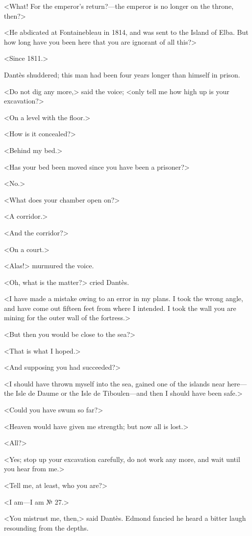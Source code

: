  <What! For the emperor's return?—the emperor is no longer on the throne, then?> 

 <He abdicated at Fontainebleau in 1814, and was sent to the Island of Elba. But how long have you been here that you are ignorant of all this?> 

 <Since 1811.> 

 Dantès shuddered; this man had been four years longer than himself in prison. 

 <Do not dig any more,> said the voice; <only tell me how high up is your excavation?> 

 <On a level with the floor.> 

 <How is it concealed?> 

 <Behind my bed.> 

 <Has your bed been moved since you have been a prisoner?> 

 <No.> 

 <What does your chamber open on?> 

 <A corridor.> 

 <And the corridor?> 

 <On a court.> 

 <Alas!> murmured the voice. 

 <Oh, what is the matter?> cried Dantès. 

 <I have made a mistake owing to an error in my plans. I took the wrong angle, and have come out fifteen feet from where I intended. I took the wall you are mining for the outer wall of the fortress.> 

 <But then you would be close to the sea?> 

 <That is what I hoped.> 

 <And supposing you had succeeded?> 

 <I should have thrown myself into the sea, gained one of the islands near here—the Isle de Daume or the Isle de Tiboulen—and then I should have been safe.> 

 <Could you have swum so far?> 

 <Heaven would have given me strength; but now all is lost.> 

 <All?> 

 <Yes; stop up your excavation carefully, do not work any more, and wait until you hear from me.> 

 <Tell me, at least, who you are?> 

 <I am—I am № 27.> 

 <You mistrust me, then,> said Dantès. Edmond fancied he heard a bitter laugh resounding from the depths. 

